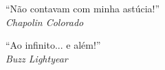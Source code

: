 \begin{titlepage}
 \vspace*{5cm}
 \begin{flushright}
  ``Não contavam com minha astúcia!''\\\textit{Chapolin Colorado}
  \vspace{1cm}
 \end{flushright}

 \begin{flushright}
  ``Ao infinito... e além!''\\\textit{Buzz Lightyear}
  \vspace{1cm}
 \end{flushright}
\end{titlepage}

